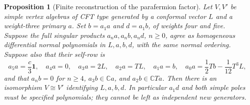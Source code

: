 \documentclass[11pt,a4paper]{article}
\newtheorem{proposition}[theorem]{Proposition}
\theoremstyle{definition}
\begin{document}
\begin{proposition}[Finite reconstruction of the parafermion factor]
\label{prop:pf13-finite-reconstruction}
Let $V,V'$ be simple vertex algebras of CFT type generated by a
conformal vector $L$ and a weight-three primary $a$. Set
$b=a_1a$ and $d=a_1b$, of weights four and five. Suppose the full
singular products $a_na,a_nb,a_nd$, $n\geq0$, agree as homogeneous
differential normal polynomials in $L,a,b,d$, with the same normal
ordering. Suppose also that their self-row is
\[
 a_5a=\frac c3\mathbf1,\quad a_4a=0,\quad a_3a=2L,\quad
 a_2a=TL,\quad a_1a=b,\quad a_0a=\frac12Tb-\frac1{12}T^3L,
\]
and that $a_nb=0$ for $n\geq4$, $a_3b\in\mathbb Ca$, and
$a_2b\in\mathbb CTa$. Then there is an isomorphism $V\cong V'$
identifying $L,a,b,d$. In particular $a_1d$ and both simple poles
must be specified polynomials; they cannot be left as independent
new generators.
\end{proposition}
\end{document}
